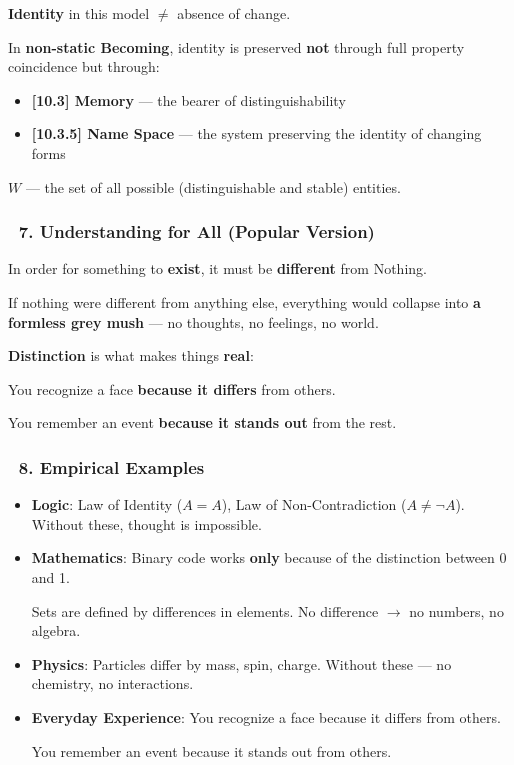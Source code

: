 \documentclass[12pt]{article}
\begin{document}
\textbf{Identity} in this model $\neq$ absence of change.

In \textbf{non-static Becoming}, identity is preserved \textbf{not} through full property coincidence but through:
\begin{itemize}
\item \textbf{[10.3] Memory} — the bearer of distinguishability
\item \textbf{[10.3.5] Name Space} — the system preserving the identity of changing forms
\end{itemize}

\textbf{$W$} — the set of all possible (distinguishable and stable) entities.

\subsubsection*{🔹 7. Understanding for All (Popular Version)}
In order for something to \textbf{exist}, it must be \textbf{different} from Nothing.

If nothing were different from anything else, everything would collapse into \textbf{a formless grey mush} — no thoughts, no feelings, no world.

\bigskip
\textbf{Distinction} is what makes things \textbf{real}:

You recognize a face \textbf{because it differs} from others.

You remember an event \textbf{because it stands out} from the rest.

\subsubsection*{🔹 8. Empirical Examples}
\begin{itemize}
\item \textbf{Logic}: 
Law of Identity ($A = A$), Law of Non-Contradiction ($A \neq \neg A$). Without these, thought is impossible.

\item \textbf{Mathematics}: 
Binary code works \textbf{only} because of the distinction between 0 and 1.

Sets are defined by differences in elements. No difference $\rightarrow$ no numbers, no algebra.

\item \textbf{Physics}: 
Particles differ by mass, spin, charge. Without these — no chemistry, no interactions.

\item \textbf{Everyday Experience}: 
You recognize a face because it differs from others.

You remember an event because it stands out from others.
\end{itemize}
\end{document}
